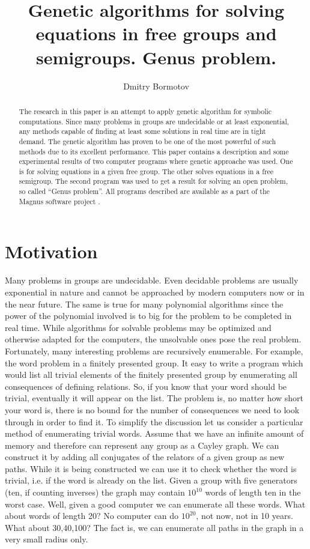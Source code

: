\documentclass{article}
\title{Genetic algorithms for solving
equations in free groups and semigroups.  Genus problem.}
\author{Dmitry Bormotov} \date{}
\begin{document}
\maketitle

\begin{abstract}
The research in this paper is an attempt to apply genetic algorithm
for symbolic computations. Since many problems in groups are
undecidable or at least exponential, any methods capable of finding at
least some solutions in real time are in tight demand. The genetic
algorithm has proven to be one of the most powerful of such methods
due to its excellent performance. This paper contains a description
and some experimental results of two computer programs where genetic
approache was used. One is for solving equations in a given free
group. The other solves equations in a free semigroup. The second
program was used to get a result for solving an open problem, so
called ``Genus problem''. All programs described are available as a
part of the Magnus software project \cite{Magnus}.
\end{abstract}

\section{Motivation}

Many problems in groups are undecidable. Even decidable
problems are usually exponential in nature and cannot be approached by
modern computers now or in the near future. The same is true for many
polynomial algorithms since the power of the polynomial involved is to
big for the problem to be completed in real time. While algorithms for
solvable problems may be optimized and otherwise adapted for the
computers, the unsolvable ones pose the real problem. Fortunately,
many interesting problems are recursively enumerable. For example, the
word problem in a finitely presented group. It easy to write a program
which would list all trivial elements of the finitely presented group
by enumerating all consequences of defining relations. So, if you know
that your word should be trivial, eventually it will appear on the
list. The problem is, no matter how short your word is, there is no
bound for the number of consequences we need to look through in order
to find it. To simplify the discussion let us consider a particular
method of enumerating trivial words. Assume that we have an infinite
amount of memory and therefore can represent any group as a Cayley
graph. We can construct it by adding all conjugates of the relators of
a given group as new paths. While it is being constructed we can use
it to check whether the word is trivial, i.e. if the word is already
on the list. Given a group with five generators (ten, if counting
inverses) the graph may contain $10^{10}$ words of length ten in the
worst case. Well, given a good computer we can enumerate all these
words. What about words of length 20? No computer can do $10^{20}$,
not now, not in 10 years. What about 30,40,100? The fact is, we can
enumerate all paths in the graph in a very small radius only.
\end{document}
